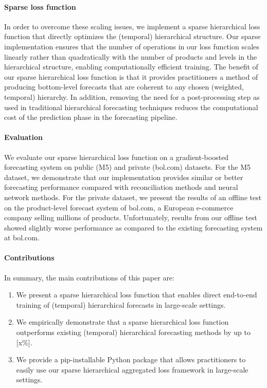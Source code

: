 \documentclass[preprint, 3p, times, twocolumn]{elsarticle}
\begin{document}
\paragraph{Sparse loss function} In order to overcome these scaling issues, we implement a sparse hierarchical loss function that directly optimizes the (temporal) hierarchical structure. Our sparse implementation ensures that the number of operations in our loss function scales linearly rather than quadratically with the number of products and levels in the hierarchical structure, enabling computationally efficient training. The benefit of our sparse hierarchical loss function is that it provides practitioners a method of producing bottom-level forecasts that are coherent to any chosen (weighted, temporal) hierarchy. In addition, removing the need for a post-processing step as used in traditional hierarchical forecasting techniques reduces the computational cost of the prediction phase in the forecasting pipeline.

\paragraph{Evaluation} We evaluate our sparse hierarchical loss function on a gradient-boosted forecasting system on public (M5) and private (bol.com) datasets. For the M5 dataset, we demonstrate that our implementation provides similar or better forecasting performance compared with reconciliation methods and neural network methods. For the private dataset, we present the results of an offline test on the product-level forecast system of bol.com, a European e-commerce company selling millions of products. Unfortunately, results from our offline test showed slightly worse performance as compared to the existing forecasting system at bol.com. 

\paragraph{Contributions} In summary, the main contributions of this paper are:
\begin{enumerate}
  \item We present a sparse hierarchical loss function that enables direct end-to-end training of (temporal) hierarchical forecasts in large-scale settings.
  \item We empirically demonstrate that a sparse hierarchical loss function outperforms existing (temporal) hierarchical forecasting methods by up to [x\%].
  \item We provide a pip-installable Python package that allows practitioners to easily use our sparse hierarchical aggregated loss framework in large-scale settings.
\end{enumerate}
\end{document}
